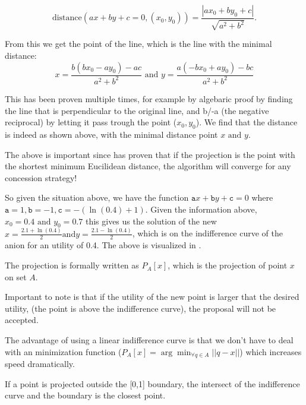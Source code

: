 \[\text{distance}(ax+by+c=0, (x_0, y_0)) = \frac{|ax_0+by_0+c|}{\sqrt{a^2+b^2}}. \]

From this we get the point of the line, which is the line with the minimal distance:
\[x = \frac{b(bx_0 - ay_0)-ac}{a^2 + b^2} \text{ and } y = \frac{a(-bx_0 + ay_0) - bc}{a^2+b^2}\]

This has been proven multiple times, for example by algebaric proof by finding the line that is perpendicular to the original line, and b/-a (the negative reciprocal) by letting it pass trough the point ($x_0, y_0$). We find that the distance is indeed as shown above, with the minimal distance point $x \text{ and }y$.

The above is important since \citet{zheng2015automated} has proven that if the projection is the point with the shortest minimum Eucilidean distance, the algorithm will converge for any concession strategy!

So given the situation above, we have the function $\texttt{a} x + \texttt{b} y + \texttt{c} = 0$ where $\texttt{a} = 1, \texttt{b} = -1, \texttt{c} = -(\ln(0.4)+1)$. Given the information above, $x_0 = 0.4 \text{ and } y_0 = 0.7$ this gives us the solution of the new $x=\frac{2.1 + \ln(0.4)}{2} \text{and} y = \frac{2.1 - \ln(0.4)}{2}$, which is on the indifference curve of the anion for an utility of 0.4.
The above is visualized in .

The projection is formally written as $P_A[x]$, which is the projection of point $x$ on set $A$. 

Important to note is that if the utility of the new point is larger that the desired utility, (the point is above the indifference curve), the proposal will not be accepted.

The advantage of using a linear indifference curve is that we don't have to deal with an minimization function ($P_A[x] = \arg \min_{\forall q \in A} ||q-x||$) which increases speed dramatically.

If a point is projected outside the [0,1] boundary, the intersect of the indifference curve and the boundary is the closest point.

